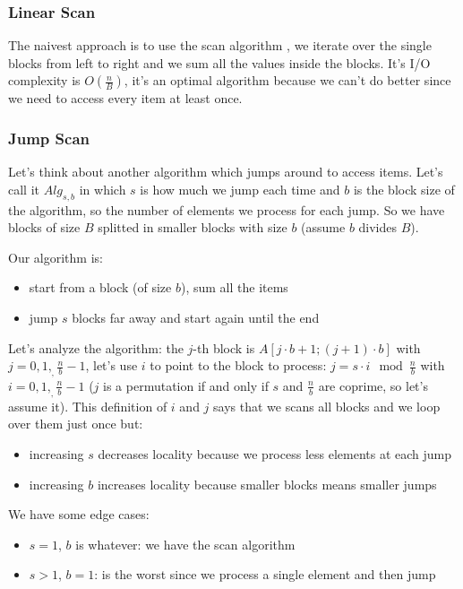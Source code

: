 \subsubsection{Linear Scan}
The naivest approach is to use the scan algorithm , we iterate over the single blocks from left to right and we sum all the values inside the blocks.
It's I/O complexity is $O(\frac{n}{B})$, it's an optimal algorithm because we can't do better since we need to access every item at least once.

\subsubsection{Jump Scan}
Let's think about another algorithm which jumps around to access items. Let's call it $Alg_{s,b}$ in which $s$ is how much we jump each time and $b$ is the block size of the algorithm, so the number of elements we process for each jump.
So we have blocks of size $B$ splitted in smaller blocks with size $b$ (assume $b$ divides $B$).

Our algorithm is:
\begin{itemize}
    \item start from a block (of size $b$), sum all the items
    \item jump $s$ blocks far away and start again until the end
\end{itemize}

Let's analyze the algorithm: the $j$-th block is $A[j \cdot b + 1; (j+1) \cdot b]$ with $j=0, 1,_,\frac{n}{b}-1$, let's use $i$ to point to the block to process: $j = s \cdot i \mod \frac{n}{b}$ with $i=0, 1,_, \frac{n}{b}-1$ ($j$ is a permutation if and only if $s$ and $\frac{n}{b}$ are coprime, so let's assume it).
This definition of $i$ and $j$ says that we scans all blocks and we loop over them just once but:
\begin{itemize}
    \item increasing $s$ decreases locality because we process less elements at each jump
    \item increasing $b$ increases locality because smaller blocks means smaller jumps
\end{itemize}

We have some edge cases:
\begin{itemize}
    \item $s=1$, $b$ is whatever: we have the scan algorithm
    \item $s>1$, $b=1$: is the worst since we process a single element and then jump
\end{itemize}

